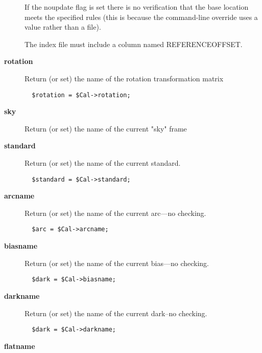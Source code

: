 \begin{description}
If the noupdate flag is set there is no verification that the base
location meets the specified rules (this is because the command-line
override uses a value rather than a file).



The index file must include a column named REFERENCEOFFSET.


\item[\textbf{rotation}] \mbox{}

Return (or set) the name of the rotation transformation matrix

\begin{verbatim}
  $rotation = $Cal->rotation;
\end{verbatim}

\item[\textbf{sky}] \mbox{}

Return (or set) the name of the current "sky" frame


\item[\textbf{standard}] \mbox{}

Return (or set) the name of the current standard.

\begin{verbatim}
  $standard = $Cal->standard;
\end{verbatim}

\item[\textbf{arcname}] \mbox{}

Return (or set) the name of the current arc---no checking.

\begin{verbatim}
  $arc = $Cal->arcname;
\end{verbatim}

\item[\textbf{biasname}] \mbox{}

Return (or set) the name of the current bias---no checking.

\begin{verbatim}
  $dark = $Cal->biasname;
\end{verbatim}

\item[\textbf{darkname}] \mbox{}

Return (or set) the name of the current dark--no checking.

\begin{verbatim}
  $dark = $Cal->darkname;
\end{verbatim}

\item[\textbf{flatname}] \mbox{}


\end{description}
